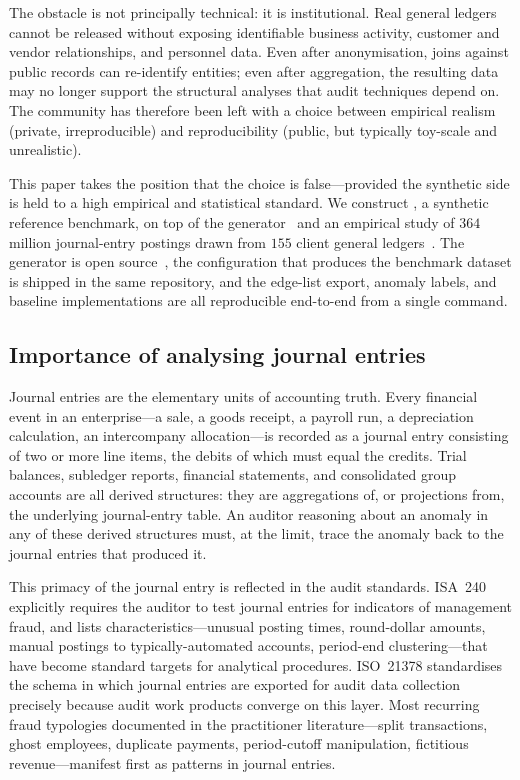 The obstacle is not principally technical: it is institutional.  Real
general ledgers cannot be released without exposing identifiable
business activity, customer and vendor relationships, and personnel
data.  Even after anonymisation, joins against public records can
re-identify entities; even after aggregation, the resulting data may
no longer support the structural analyses that audit techniques
depend on.  The community has therefore been left with a choice
between empirical realism (private, irreproducible) and
reproducibility (public, but typically toy-scale and unrealistic).

This paper takes the position that the choice is false---provided the
synthetic side is held to a high empirical and statistical standard.
We construct \bench{}, a synthetic reference benchmark, on top of the
\system{} generator~\citep{ivertowski2026datasynth} and an empirical
study of $364$ million journal-entry postings drawn from $155$ client
general ledgers~\citep{ivertowski2024apn}.  The generator is open
source~\citep{datasynth-repo}, the configuration that produces the
benchmark dataset is shipped in the same repository, and the
edge-list export, anomaly labels, and baseline implementations are
all reproducible end-to-end from a single command.

\subsection{Importance of analysing journal entries}
\label{sec:introduction:je-importance}

Journal entries are the elementary units of accounting truth.  Every
financial event in an enterprise---a sale, a goods receipt, a payroll
run, a depreciation calculation, an intercompany allocation---is
recorded as a journal entry consisting of two or more line items, the
debits of which must equal the credits.  Trial balances, subledger
reports, financial statements, and consolidated group accounts are all
derived structures: they are aggregations of, or projections from, the
underlying journal-entry table.  An auditor reasoning about an
anomaly in any of these derived structures must, at the limit, trace
the anomaly back to the journal entries that produced it.

This primacy of the journal entry is reflected in the audit standards.
ISA~240~\citep{isa240} explicitly requires the auditor to test
journal entries for indicators of management fraud, and lists
characteristics---unusual posting times, round-dollar amounts, manual
postings to typically-automated accounts, period-end clustering---that
have become standard targets for analytical procedures.  ISO~21378
\citep{iso21378} standardises the schema in which journal entries are
exported for audit data collection precisely because audit work
products converge on this layer.  Most recurring fraud typologies
documented in the practitioner literature---split transactions, ghost
employees, duplicate payments, period-cutoff manipulation, fictitious
revenue---manifest first as patterns in journal entries.

